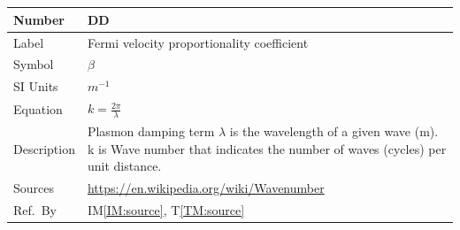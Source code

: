 \documentclass[12pt]{article}
\newcommand{\colAwidth}{0.13\textwidth}
\newcommand{\colBwidth}{0.82\textwidth}
\newcounter{defnum} %
\newcounter{datadefnum} %
\begin{document}
~\newline


~\newline

\noindent
\begin{minipage}{\textwidth}
	\renewcommand*{\arraystretch}{1.5}
	\begin{tabular}{| p{\colAwidth} | p{\colBwidth}|}
		\hline
		\rowcolor[gray]{0.9}
		Number& DD{datadefnum}\thedatadefnum \label{DD:beta}\\
		\hline
		Label& Fermi velocity proportionality coefficient \\
		\hline
		Symbol &$\beta$\\
		\hline
		SI Units & $m^{-1}$\\
		\hline
		Equation&$k=\frac{2\pi}{\lambda}$\\
		\hline
		Description &Plasmon damping term 
		$\lambda$ is the wavelength of a given wave (m). k is Wave number that indicates the  number of waves (cycles) per unit distance.
		\\
		\hline
		Sources& \url{https://en.wikipedia.org/wiki/Wavenumber} \\
		\hline
		Ref.\ By & IM\ref{IM:source}, T\ref{TM:source} \\
		\hline
	\end{tabular}
\end{minipage}\\

~\newline
\end{document}
